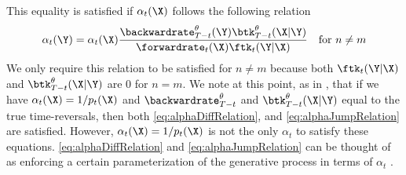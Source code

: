 This equality is satisfied if $\alpha_t(\X)$ follows the following relation
\begin{equation}
    \alpha_t(\Y) = \alpha_t(\X) \frac{\backwardrate_{T-t}^\theta(\Y) \btk_{T-t}^\theta(\X | \Y)}{\forwardrate_t(\X) \ftk_t(\Y | \X)} \quad \text{for } n \neq m
    \label{eq:alphaJumpRelation}
\end{equation}
We only require this relation to be satisfied for $n \neq m$ because both $\ftk_t(\Y | \X)$ and $\btk_{T-t}^\theta(\X | \Y)$ are $0$ for $n = m$.
We note at this point, as in \cite{benton2022denoising}, that if we have $\alpha_t(\X) = 1/p_t(\X)$ and $\backwardrate_{T-t}^\theta$ and $\btk_{T-t}^\theta(\X | \Y)$ equal to the true time-reversals, then both \eqref{eq:alphaDiffRelation}, and \eqref{eq:alphaJumpRelation} are satisfied. However, $\alpha_t(\X) = 1/p_t(\X)$ is not the only $\alpha_t$ to satisfy these equations. \eqref{eq:alphaDiffRelation} and \eqref{eq:alphaJumpRelation} can be thought of as enforcing a certain parameterization of the generative process in terms of $\alpha_t$ \cite{benton2022denoising}.


